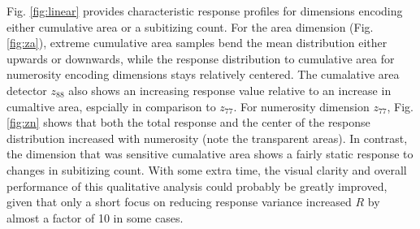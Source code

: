 \documentclass[twocolumn]{article}
\begin{document}
Fig. \ref{fig:linear}  provides characteristic response profiles for dimensions
encoding either cumulative area or a subitizing count. For the area
dimension (Fig. \ref{fig:za}), extreme cumulative area samples bend the mean distribution
either upwards or downwards, while the response distribution to
cumulative area for numerosity encoding dimensions stays relatively
centered. The cumalative area detector \(z_{88}\) also shows an increasing response value relative to an increase in cumaltive area, espcially in comparison to \(z_{77}\). For numerosity dimension \(z_{77}\), Fig. \ref{fig:zn} shows that both the total response and the center of the response distribution increased with
numerosity (note the transparent areas). In contrast, the dimension that was sensitive cumalative area shows a fairly
static response to changes in subitizing count. With some extra time,
the visual clarity and overall performance of this qualitative analysis
could probably be greatly improved, given that only a short focus on
reducing response variance increased \(R\) by almost a factor of 10 in
some cases.
\end{document}
